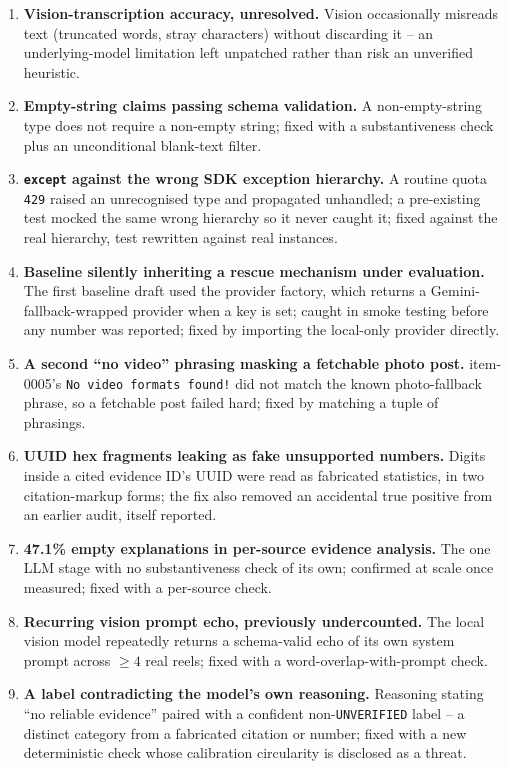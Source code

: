 \documentclass[conference]{IEEEtran}
\begin{document}
\begin{enumerate}
\item \textbf{Vision-transcription accuracy, unresolved.} Vision occasionally misreads text (truncated words, stray characters) without discarding it -- an underlying-model limitation left unpatched rather than risk an unverified heuristic.
\item \textbf{Empty-string claims passing schema validation.} A non-empty-string type does not require a non-empty string; fixed with a substantiveness check plus an unconditional blank-text filter.
\item \textbf{\texttt{except} against the wrong SDK exception hierarchy.} A routine quota \texttt{429} raised an unrecognised type and propagated unhandled; a pre-existing test mocked the same wrong hierarchy so it never caught it; fixed against the real hierarchy, test rewritten against real instances.
\item \textbf{Baseline silently inheriting a rescue mechanism under evaluation.} The first baseline draft used the provider factory, which returns a Gemini-fallback-wrapped provider when a key is set; caught in smoke testing before any number was reported; fixed by importing the local-only provider directly.
\item \textbf{A second ``no video'' phrasing masking a fetchable photo post.} item-0005's \texttt{No video formats found!} did not match the known photo-fallback phrase, so a fetchable post failed hard; fixed by matching a tuple of phrasings.
\item \textbf{UUID hex fragments leaking as fake unsupported numbers.} Digits inside a cited evidence ID's UUID were read as fabricated statistics, in two citation-markup forms; the fix also removed an accidental true positive from an earlier audit, itself reported.
\item \textbf{47.1\% empty explanations in per-source evidence analysis.} The one LLM stage with no substantiveness check of its own; confirmed at scale once measured; fixed with a per-source check.
\item \textbf{Recurring vision prompt echo, previously undercounted.} The local vision model repeatedly returns a schema-valid echo of its own system prompt across $\geq 4$ real reels; fixed with a word-overlap-with-prompt check.
\item \textbf{A label contradicting the model's own reasoning.} Reasoning stating ``no reliable evidence'' paired with a confident non-\texttt{UNVERIFIED} label -- a distinct category from a fabricated citation or number; fixed with a new deterministic check whose calibration circularity is disclosed as a threat.

\end{enumerate}
\end{document}
